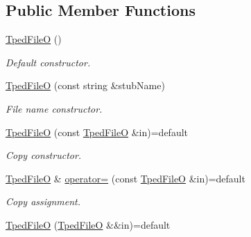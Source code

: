 \subsection*{Public Member Functions}
\begin{DoxyCompactItemize}
\item 
\mbox{\label{classsamp_files_1_1_tped_file_o_a47f1a615b8a6d5b5b5e441d82d07a4aa}} 
\hyperlink{classsamp_files_1_1_tped_file_o_a47f1a615b8a6d5b5b5e441d82d07a4aa}{Tped\+FileO} ()
\begin{DoxyCompactList}\small\item\em Default constructor. \end{DoxyCompactList}\item 
\hyperlink{classsamp_files_1_1_tped_file_o_ae860f2f0261c1638579635e6c9d54bb2}{Tped\+FileO} (const string \&stub\+Name)
\begin{DoxyCompactList}\small\item\em File name constructor. \end{DoxyCompactList}\item 
\mbox{\label{classsamp_files_1_1_tped_file_o_a4b64bf6ed6497e05ecc7d495e8e7efa5}} 
\hyperlink{classsamp_files_1_1_tped_file_o_a4b64bf6ed6497e05ecc7d495e8e7efa5}{Tped\+FileO} (const \hyperlink{classsamp_files_1_1_tped_file_o}{Tped\+FileO} \&in)=default
\begin{DoxyCompactList}\small\item\em Copy constructor. \end{DoxyCompactList}\item 
\mbox{\label{classsamp_files_1_1_tped_file_o_a981c7407df0c31303dd147171aaa5edc}} 
\hyperlink{classsamp_files_1_1_tped_file_o}{Tped\+FileO} \& \hyperlink{classsamp_files_1_1_tped_file_o_a981c7407df0c31303dd147171aaa5edc}{operator=} (const \hyperlink{classsamp_files_1_1_tped_file_o}{Tped\+FileO} \&in)=default
\begin{DoxyCompactList}\small\item\em Copy assignment. \end{DoxyCompactList}\item 
\mbox{\label{classsamp_files_1_1_tped_file_o_a4e9f81357e7ad91867341a103aba30b9}} 
\hyperlink{classsamp_files_1_1_tped_file_o_a4e9f81357e7ad91867341a103aba30b9}{Tped\+FileO} (\hyperlink{classsamp_files_1_1_tped_file_o}{Tped\+FileO} \&\&in)=default

\end{DoxyCompactItemize}
